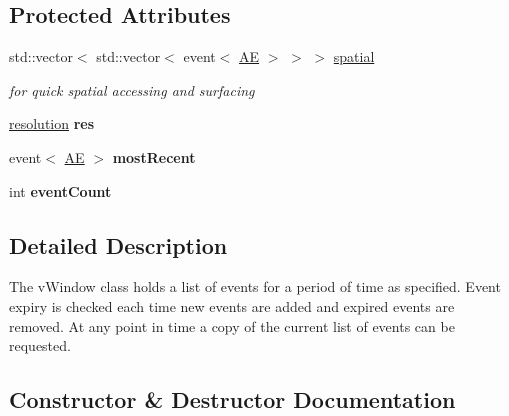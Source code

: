 \subsection*{Protected Attributes}
\begin{DoxyCompactItemize}
\item 
\mbox{\label{classev_1_1vSurface_a157b4d26be73a1de42b0a043f12cf984}} 
std\+::vector$<$ std\+::vector$<$ event$<$ \hyperlink{classev_1_1AddressEvent}{AE} $>$ $>$ $>$ \hyperlink{classev_1_1vSurface_a157b4d26be73a1de42b0a043f12cf984}{spatial}
\begin{DoxyCompactList}\small\item\em for quick spatial accessing and surfacing \end{DoxyCompactList}\item 
\mbox{\label{classev_1_1vSurface_a7ba9be674dbe03302b56306b987cff62}} 
\hyperlink{structev_1_1resolution}{resolution} {\bfseries res}
\item 
\mbox{\label{classev_1_1vSurface_a64339e84abccbb0099e0236fa4339647}} 
event$<$ \hyperlink{classev_1_1AddressEvent}{AE} $>$ {\bfseries most\+Recent}
\item 
\mbox{\label{classev_1_1vSurface_a2b6a8d84a626b8dce15597807da598fb}} 
int {\bfseries event\+Count}
\end{DoxyCompactItemize}


\subsection{Detailed Description}
The v\+Window class holds a list of events for a period of time as specified. Event expiry is checked each time new events are added and expired events are removed. At any point in time a copy of the current list of events can be requested. 

\subsection{Constructor \& Destructor Documentation}
\mbox{\label{classev_1_1vSurface_afb642ce656aee165c54a2238474599c0}} 
